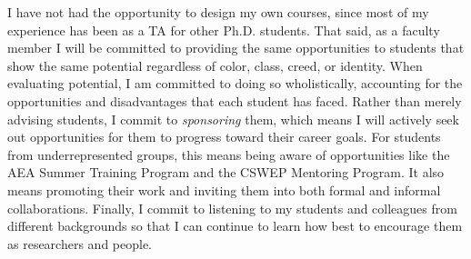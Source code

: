 \documentclass{jmstatement}
\begin{document}
I have not had the opportunity to design my own courses, since most of my
experience has been as a TA for other Ph.D. students. That said, as a faculty
member I will be committed to providing the same opportunities to students that
show the same potential regardless of color, class, creed, or identity. When
evaluating potential, I am committed to doing so wholistically, accounting for
the opportunities and disadvantages that each student has faced. Rather than
merely advising students, I commit to \textit{sponsoring} them, which means I
will actively seek out opportunities for them to progress toward their career
goals. For students from underrepresented groups, this means being aware of
opportunities like the AEA Summer Training Program and the CSWEP Mentoring Program.
It also means promoting their work and inviting them into both formal and informal
collaborations. Finally, I commit to listening to my students and colleagues
from different backgrounds so that I can continue to learn how best to encourage
them as researchers and people.
\end{document}
